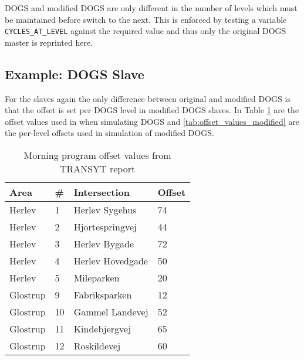 DOGS and modified DOGS are only different in the number of levels which must be maintained before switch to the next. This is enforced by testing a variable \verb|CYCLES_AT_LEVEL| against the required value and thus only the original DOGS master is reprinted here.



\subsection{Example: DOGS Slave}
For the slaves again the only difference between original and modified DOGS is that the offset is set per DOGS level in modified DOGS slaves. In Table \ref{tab:offset_values} are the offset values used in when simulating DOGS and \ref{tab:offset_values_modified} are the per-level offsets used in simulation of modified DOGS.

\begin{table}[ht]
\centering
\begin{tabular}{l|l|l|l}
\textbf{Area} & \textbf{\#} & \textbf{Intersection} & \textbf{Offset}\\ \hline
Herlev & 1 & Herlev Sygehus & 74\\
Herlev & 2 & Hjortespringvej & 44\\
Herlev & 3 & Herlev Bygade & 72\\
Herlev & 4 & Herlev Hovedgade & 50\\
Herlev & 5 & Mileparken & 20\\ \hline
Glostrup & 9 & Fabriksparken & 12\\
Glostrup & 10 & Gammel Landevej & 52\\
Glostrup & 11 & Kindebjergvej & 65\\
Glostrup & 12 & Roskildevej & 60\\
\end{tabular}
\caption{Morning program offset values from TRANSYT report \cite{transyt}}
\label{tab:offset_values}
\end{table}

